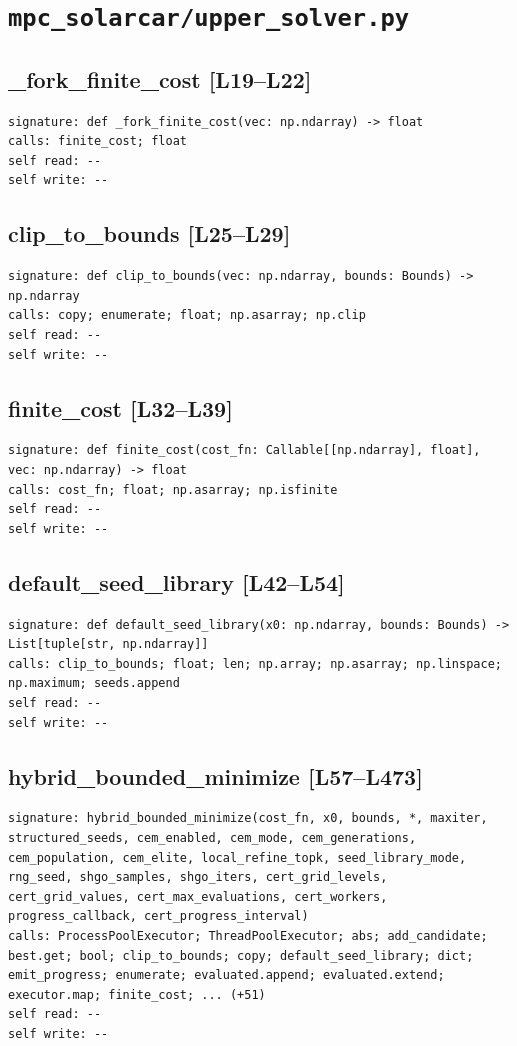 \documentclass[a4paper,10pt,oneside]{book}
\begin{document}
\section{\texttt{mpc\_solarcar/upper\_solver.py}}
\subsection*{\_fork\_finite\_cost [L19--L22]}
\begin{lstlisting}[numbers=none]
signature: def _fork_finite_cost(vec: np.ndarray) -> float
calls: finite_cost; float
self read: --
self write: --
\end{lstlisting}
\subsection*{clip\_to\_bounds [L25--L29]}
\begin{lstlisting}[numbers=none]
signature: def clip_to_bounds(vec: np.ndarray, bounds: Bounds) -> np.ndarray
calls: copy; enumerate; float; np.asarray; np.clip
self read: --
self write: --
\end{lstlisting}
\subsection*{finite\_cost [L32--L39]}
\begin{lstlisting}[numbers=none]
signature: def finite_cost(cost_fn: Callable[[np.ndarray], float], vec: np.ndarray) -> float
calls: cost_fn; float; np.asarray; np.isfinite
self read: --
self write: --
\end{lstlisting}
\subsection*{default\_seed\_library [L42--L54]}
\begin{lstlisting}[numbers=none]
signature: def default_seed_library(x0: np.ndarray, bounds: Bounds) -> List[tuple[str, np.ndarray]]
calls: clip_to_bounds; float; len; np.array; np.asarray; np.linspace; np.maximum; seeds.append
self read: --
self write: --
\end{lstlisting}
\subsection*{hybrid\_bounded\_minimize [L57--L473]}
\begin{lstlisting}[numbers=none]
signature: hybrid_bounded_minimize(cost_fn, x0, bounds, *, maxiter, structured_seeds, cem_enabled, cem_mode, cem_generations, cem_population, cem_elite, local_refine_topk, seed_library_mode, rng_seed, shgo_samples, shgo_iters, cert_grid_levels, cert_grid_values, cert_max_evaluations, cert_workers, progress_callback, cert_progress_interval)
calls: ProcessPoolExecutor; ThreadPoolExecutor; abs; add_candidate; best.get; bool; clip_to_bounds; copy; default_seed_library; dict; emit_progress; enumerate; evaluated.append; evaluated.extend; executor.map; finite_cost; ... (+51)
self read: --
self write: --
\end{lstlisting}
\end{document}
